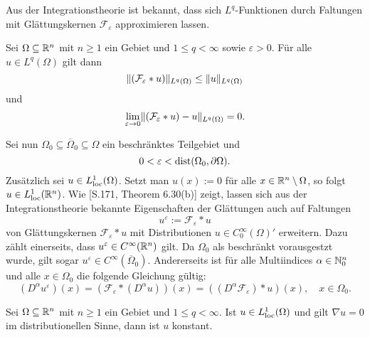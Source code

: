 Aus der Integrationstheorie ist bekannt, dass sich $L^q$-Funktionen durch Faltungen mit Glättungskernen $\mathcal{F}_\varepsilon$ approximieren lassen.

\begin{lem}
  \label{lem:mollification}
  Sei $\Omega \subseteq \mathbb{R}^n$ mit $n \geq 1$ ein Gebiet und $1 \leq q < \infty$ sowie $\varepsilon > 0$.
  Für alle $u \in L^q(\Omega)$ gilt dann
  $$
  \lVert (\mathcal{F}_\varepsilon \ast u) \rVert_{L^q(\Omega)} \leq  \lVert u \rVert_{L^q(\Omega)}
  $$
  und
  \begin{displaymath}
    \lim_{\varepsilon \to 0} \lVert (\mathcal{F}_\varepsilon \ast u) - u \rVert_{L^q(\Omega)} = 0. 
  \end{displaymath}
\end{lem}

Sei nun $\Omega_0 \subseteq \overline\Omega_0 \subseteq \Omega$ ein beschränktes Teilgebiet und
\begin{equation}
  \label{eq:convolutionEpsilon}
  0 < \varepsilon < \operatorname{dist}(\Omega_0, \partial\Omega).
\end{equation}
Zusätzlich sei $u \in L^1_{\operatorname{loc}}(\Omega)$.
Setzt man $u(x) := 0$ für alle $x \in \mathbb{R}^n \setminus \Omega$, so folgt $u \in L^1_{\operatorname{loc}}(\mathbb{R}^n)$.
Wie \cite{rudin1991fa}[S.171, Theorem 6.30(b)] zeigt, lassen sich aus der Integrationstheorie bekannte Eigenschaften der Glättungen auch auf Faltungen 
$$
u^\varepsilon := \mathcal{F}_\varepsilon \ast u
$$
von Glättungskernen $\mathcal{F}_\varepsilon \ast u$ mit Distributionen $u \in C_0^\infty(\Omega)'$ erweitern.
Dazu zählt einerseits, dass $u^\varepsilon \in C^\infty(\mathbb{R}^n)$ gilt.
Da $\Omega_0$ als beschränkt vorausgestzt wurde, gilt sogar $u^\varepsilon \in C^\infty(\overline\Omega_0)$.
Andererseits ist für alle Multiindices $\alpha \in \mathbb{N}_0^n$ und alle $x \in \Omega_0$ die folgende Gleichung gültig:
\begin{equation}
  \label{eq:convolutionDiff}
  (D^\alpha u^\varepsilon)(x) 
  = (\mathcal{F}_\varepsilon \ast (D^\alpha u))(x)
  = ( (D^\alpha \mathcal{F}_\varepsilon) \ast u)(x), \quad x \in \Omega_0.
\end{equation}

\begin{lem}
  Sei $\Omega \subseteq \mathbb{R}^n$ mit $n \geq 1$ ein Gebiet und $1 \leq q < \infty$.
  Ist $u \in L^1_{\operatorname{loc}}(\Omega)$ und gilt $\nabla u = 0$ im distributionellen Sinne, dann ist $u$ konstant.
\end{lem}

